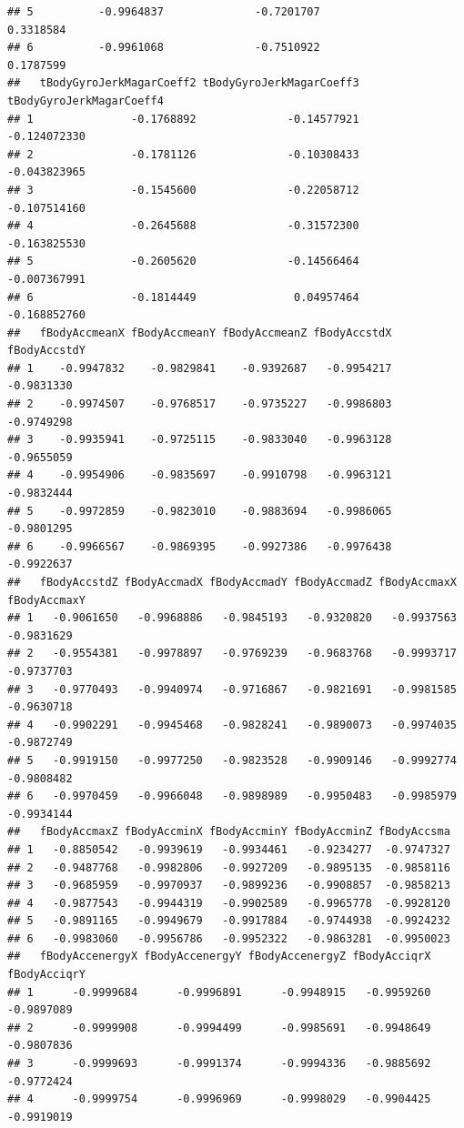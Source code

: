 \documentclass[
]{article}
\begin{document}
\begin{verbatim}
## 5          -0.9964837              -0.7201707                0.3318584
## 6          -0.9961068              -0.7510922                0.1787599
##   tBodyGyroJerkMagarCoeff2 tBodyGyroJerkMagarCoeff3 tBodyGyroJerkMagarCoeff4
## 1               -0.1768892              -0.14577921             -0.124072330
## 2               -0.1781126              -0.10308433             -0.043823965
## 3               -0.1545600              -0.22058712             -0.107514160
## 4               -0.2645688              -0.31572300             -0.163825530
## 5               -0.2605620              -0.14566464             -0.007367991
## 6               -0.1814449               0.04957464             -0.168852760
##   fBodyAccmeanX fBodyAccmeanY fBodyAccmeanZ fBodyAccstdX fBodyAccstdY
## 1    -0.9947832    -0.9829841    -0.9392687   -0.9954217   -0.9831330
## 2    -0.9974507    -0.9768517    -0.9735227   -0.9986803   -0.9749298
## 3    -0.9935941    -0.9725115    -0.9833040   -0.9963128   -0.9655059
## 4    -0.9954906    -0.9835697    -0.9910798   -0.9963121   -0.9832444
## 5    -0.9972859    -0.9823010    -0.9883694   -0.9986065   -0.9801295
## 6    -0.9966567    -0.9869395    -0.9927386   -0.9976438   -0.9922637
##   fBodyAccstdZ fBodyAccmadX fBodyAccmadY fBodyAccmadZ fBodyAccmaxX fBodyAccmaxY
## 1   -0.9061650   -0.9968886   -0.9845193   -0.9320820   -0.9937563   -0.9831629
## 2   -0.9554381   -0.9978897   -0.9769239   -0.9683768   -0.9993717   -0.9737703
## 3   -0.9770493   -0.9940974   -0.9716867   -0.9821691   -0.9981585   -0.9630718
## 4   -0.9902291   -0.9945468   -0.9828241   -0.9890073   -0.9974035   -0.9872749
## 5   -0.9919150   -0.9977250   -0.9823528   -0.9909146   -0.9992774   -0.9808482
## 6   -0.9970459   -0.9966048   -0.9898989   -0.9950483   -0.9985979   -0.9934144
##   fBodyAccmaxZ fBodyAccminX fBodyAccminY fBodyAccminZ fBodyAccsma
## 1   -0.8850542   -0.9939619   -0.9934461   -0.9234277  -0.9747327
## 2   -0.9487768   -0.9982806   -0.9927209   -0.9895135  -0.9858116
## 3   -0.9685959   -0.9970937   -0.9899236   -0.9908857  -0.9858213
## 4   -0.9877543   -0.9944319   -0.9902589   -0.9965778  -0.9928120
## 5   -0.9891165   -0.9949679   -0.9917884   -0.9744938  -0.9924232
## 6   -0.9983060   -0.9956786   -0.9952322   -0.9863281  -0.9950023
##   fBodyAccenergyX fBodyAccenergyY fBodyAccenergyZ fBodyAcciqrX fBodyAcciqrY
## 1      -0.9999684      -0.9996891      -0.9948915   -0.9959260   -0.9897089
## 2      -0.9999908      -0.9994499      -0.9985691   -0.9948649   -0.9807836
## 3      -0.9999693      -0.9991374      -0.9994336   -0.9885692   -0.9772424
## 4      -0.9999754      -0.9996969      -0.9998029   -0.9904425   -0.9919019

\end{verbatim}
\end{document}
